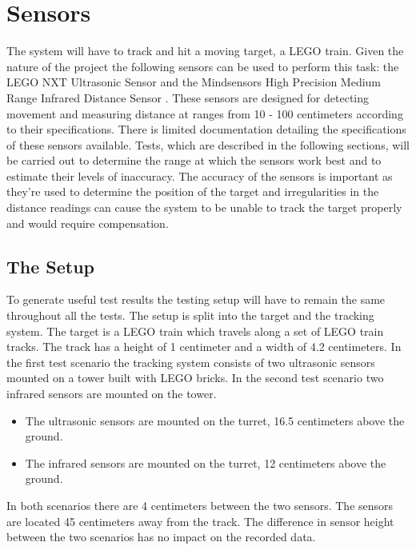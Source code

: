 \section{Sensors}\label{sec:sensors}\label{\automlabel}
The system will have to track and hit a moving target, a LEGO train. Given the nature of the project the following sensors can be used to perform this task: the LEGO NXT Ultrasonic Sensor \cite{legoultrasonic} and the Mindsensors High Precision Medium Range Infrared Distance Sensor \cite{mindinfrared}. These sensors are designed for detecting movement and measuring distance at ranges from 10 - 100 centimeters according to their specifications. There is limited documentation detailing the specifications of these sensors available. Tests, which are described in the following sections, will be carried out to determine the range at which the sensors work best and to estimate their levels of inaccuracy. The accuracy of the sensors is important as they're used to determine the position of the target and irregularities in the distance readings can cause the system to be unable to track the target properly and would require compensation. \\
\eal

\subsection{The Setup}
To generate useful test results the testing setup will have to remain the same throughout all the tests.
The setup is split into the target and the tracking system. The target is a LEGO train which travels along a set of LEGO train tracks. The track has a height of 1 centimeter and a width of 4.2 centimeters. In the first test scenario the tracking system consists of two ultrasonic sensors mounted on a tower built with LEGO bricks. In the second test scenario two infrared sensors are mounted on the tower. 

\begin{itemize}
\item The ultrasonic sensors are mounted on the turret, 16.5 centimeters above the ground.
\item The infrared sensors are mounted on the turret, 12 centimeters above the ground.
\end{itemize}

In both scenarios there are 4 centimeters between the two sensors. The sensors are located 45 centimeters away from the track. The difference in sensor height between the two scenarios has no impact on the recorded data. \\

